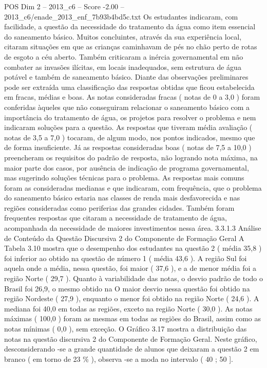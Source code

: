 \begin{textsample}{POS Dim 2 – 2013\_c6 – Score -2.00 – 2013\_c6/enade\_2013\_enf\_7b93b4bd5c.txt}
Os estudantes indicaram, com facilidade, a questão da necessidade do tratamento da água como item essencial do saneamento básico.
Muitos concluintes, através da sua experiência local, citaram situações em que as crianças caminhavam de pés no chão perto de rotas de esgoto a céu aberto.
Também criticaram a inércia governamental em não combater as invasões ilícitas, em locais inadequados, sem estrutura de água potável e também de saneamento básico.
Diante das observações preliminares pode ser extraída uma classificação das respostas obtidas que ficou estabelecida em fracas, médias e boas.
As notas consideradas fracas ( notas de 0 a 3,0 ) foram conferidas àqueles que não conseguiram relacionar o saneamento básico com a importância do tratamento de água, os projetos para resolver o problema e nem indicaram soluções para a questão.
As respostas que tiveram média avaliação ( notas de 3,5 a 7,0 ) tocaram, de algum modo, nos pontos indicados, mesmo que de forma insuficiente.
Já as respostas consideradas boas ( notas de 7,5 a 10,0 ) preencheram os requisitos do padrão de resposta, não logrando nota máxima, na maior parte dos casos, por ausência de indicação de programa governamental, mas sugerindo soluções técnicas para o problema.
As respostas mais comuns foram as consideradas medianas e que indicaram, com frequência, que o problema do saneamento básico estaria nas classes de renda mais desfavorecida e nas regiões consideradas como periferias das grandes cidades.
Também foram frequentes respostas que citaram a necessidade de tratamento de água, acompanhada da necessidade de maiores investimentos nessa área. 3.3.1.3 Análise de Conteúdo da Questão Discursiva 2 do Componente de Formação Geral A Tabela 3.10 mostra que o desempenho dos estudantes na questão 2 ( média 35,8 ) foi inferior ao obtido na questão de número 1 ( média 43,6 ).
A região Sul foi aquela onde a média, nessa questão, foi maior ( 37,6 ), e a de menor média foi a região Norte ( 29,7 ).
Quanto à variabilidade das notas, o desvio padrão de todo o Brasil foi 26,9, o mesmo obtido na O maior desvio nessa questão foi obtido na região Nordeste ( 27,9 ), enquanto o menor foi obtido na região Norte ( 24,6 ).
A mediana foi 40,0 em todas as regiões, exceto na região Norte ( 30,0 ).
As notas máximas ( 100,0 ) foram as mesmas em todas as regiões do Brasil, assim como as notas mínimas ( 0,0 ), sem exceção.
O Gráfico 3.17 mostra a distribuição das notas na questão discursiva 2 do Componente de Formação Geral.
Neste gráfico, desconsiderando -se a grande quantidade de alunos que deixaram a questão 2 em branco ( em torno de 23 \% ), observa -se a moda no intervalo ( 40 ; 50 ].

\end{textsample}
